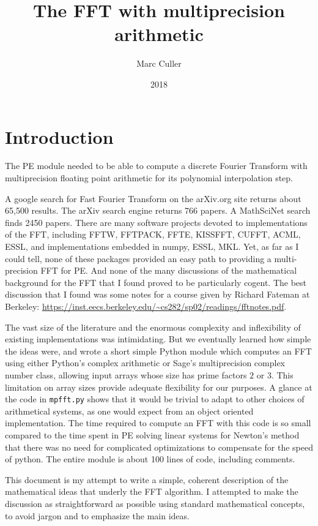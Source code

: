 \documentclass[12pt, letterpaper, oneside]{amsart}
\theoremstyle{definition}
\theoremstyle{plain}
\numberwithin{equation}{para}
\numberwithin{figure}{section}
\begin{document}
\title{The FFT with multiprecision arithmetic}
\author{Marc Culler}
\date{2018}
\maketitle
\section{Introduction}

The PE module needed to be able to compute a discrete Fourier Transform with
multiprecision floating point arithmetic for its polynomial interpolation step.

A google search for Fast Fourier Transform on the arXiv.org site returns about
65,500 results.  The arXiv search engine returns 766 papers. A MathSciNet search
finds 2450 papers.  There are many software projects devoted to implementations
of the FFT, including FFTW, FFTPACK, FFTE, KISSFFT, CUFFT, ACML, ESSL, and
implementations embedded in numpy, ESSL, MKL.  Yet, as far as I could tell, none
of these packages provided an easy path to providing a multi-precision FFT for
PE.  And none of the many discussions of the mathematical background for the FFT
that I found proved to be particularly cogent.  The best discussion that I found
was some notes for a course given by Richard Fateman at
Berkeley:\break
\url{https://inst.eecs.berkeley.edu/~cs282/sp02/readings/fftnotes.pdf}.

The vast size of the literature and the enormous complexity and inflexibility of
existing implementations was intimidating.  But we eventually learned how simple
the ideas were, and wrote a short simple Python module which computes an FFT
using either Python's complex arithmetic or Sage's multiprecision complex number
class, allowing input arrays whose size has prime factors $2$ or $3$.  This
limitation on array sizes provide adequate flexibility for our purposes.  A
glance at the code in {\tt mpfft.py} shows that it would be trivial to adapt to
other choices of arithmetical systems, as one would expect from an object
oriented implementation.  The time required to compute an FFT with this code is
so small compared to the time spent in PE solving linear systems for Newton's
method that there was no need for complicated optimizations to compensate for
the speed of python.  The entire module is about 100 lines of code, including
comments.

This document is my attempt to write a simple, coherent description of the
mathematical ideas that underly the FFT algorithm.  I attempted to make the
discussion as straightforward as possible using standard mathematical
concepts, to avoid jargon and to emphasize the main ideas.
\end{document}
